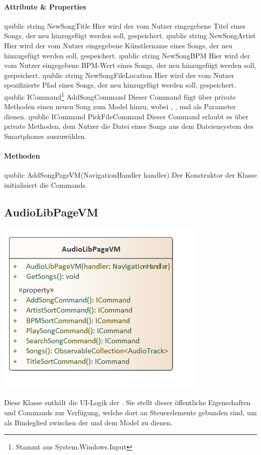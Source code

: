\documentclass[../entwurf.tex]{subfiles}
\begin{document}
\paragraph{Attribute \& Properties}
\begin{itemize}
	\i{public string NewSongTitle} Hier wird der vom Nutzer eingegebene Titel eines Songs, der neu hinzugefügt werden soll, gespeichert.
	\i{public string NewSongArtist} Hier wird der vom Nutzer eingegebene Künstlername eines Songs, der neu hinzugefügt werden soll, gespeichert.
	\i{public string NewSongBPM} Hier wird der vom Nutzer eingegebene BPM-Wert eines Songs, der neu hinzugefügt werden soll, gespeichert.
	\i{public string NewSongFileLocation} Hier wird der vom Nutzer spezifizierte Pfad eines Songs, der neu hinzugefügt werden soll, gespeichert.
	\i{public ICommand\footnote{Stammt aus System.Windows.Input} AddSongCommand} Dieser Command fügt über private Methoden einen neuen Song zum Model hinzu, wobei , ,  und  als Parameter dienen. 
	\i{public ICommand PickFileCommand} Dieser Command erlaubt es über private Methoden, dem Nutzer die Datei eines Songs aus dem Dateiensystem des Smartphones auszuwählen. 
\end{itemize}
\paragraph{Methoden}
\begin{itemize}
	\i{public AddSongPageVM(NavigationHandler handler)} Der Konstruktor der Klasse initialisiert die Commands.
\end{itemize}
\subsection{AudioLibPageVM}
\begin{minipage}{0.5\textwidth}
\includegraphics[scale=0.75]{../graphics/vm_klassen/AudioLibPageVM.png}
\end{minipage}
\begin{minipage}{0.5\textwidth}
Diese Klasse enthält die UI-Logik der . Sie stellt dieser öffentliche Eigenschaften und Commands zur Verfügung, welche dort an Steuerelemente gebunden sind, um als Bindeglied zwischen der  und dem Model zu dienen.
\end{minipage}
\end{document}
